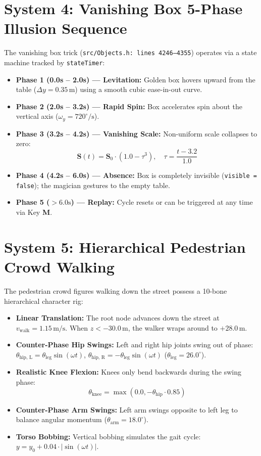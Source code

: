 \section{System 4: Vanishing Box 5-Phase Illusion Sequence}
The vanishing box trick (\texttt{src/Objects.h: lines 4246--4355}) operates via a state machine tracked by \texttt{stateTimer}:
\begin{itemize}
    \item \textbf{Phase 1 (0.0s -- 2.0s) --- Levitation:} Golden box hovers upward from the table ($\Delta y = 0.35\,\text{m}$) using a smooth cubic ease-in-out curve.
    \item \textbf{Phase 2 (2.0s -- 3.2s) --- Rapid Spin:} Box accelerates spin about the vertical axis ($\omega_y = 720^\circ/\text{s}$).
    \item \textbf{Phase 3 (3.2s -- 4.2s) --- Vanishing Scale:} Non-uniform scale collapses to zero:
    \begin{equation}
    \mathbf{S}(t) = \mathbf{S}_0 \cdot \left( 1.0 - \tau^3 \right), \quad \tau = \frac{t - 3.2}{1.0}
    \end{equation}
    \item \textbf{Phase 4 (4.2s -- 6.0s) --- Absence:} Box is completely invisible (\texttt{visible = false}); the magician gestures to the empty table.
    \item \textbf{Phase 5 ($> 6.0\text{s}$) --- Replay:} Cycle resets or can be triggered at any time via Key \textbf{M}.
\end{itemize}

\section{System 5: Hierarchical Pedestrian Crowd Walking}
The pedestrian crowd figures walking down the street possess a 10-bone hierarchical character rig:
\begin{itemize}
    \item \textbf{Linear Translation:} The root node advances down the street at $v_{\text{walk}} = 1.15\,\text{m/s}$. When $z < -30.0\,\text{m}$, the walker wraps around to $+28.0\,\text{m}$.
    \item \textbf{Counter-Phase Hip Swings:} Left and right hip joints swing out of phase: $\theta_{\text{hip, L}} = \theta_{\text{leg}} \sin(\omega t)$, $\theta_{\text{hip, R}} = -\theta_{\text{leg}} \sin(\omega t)$ ($\theta_{\text{leg}} = 26.0^\circ$).
    \item \textbf{Realistic Knee Flexion:} Knees only bend backwards during the swing phase:
    \begin{equation}
    \theta_{\text{knee}} = \max\left( 0.0, -\theta_{\text{hip}} \cdot 0.85 \right)
    \end{equation}
    \item \textbf{Counter-Phase Arm Swings:} Left arm swings opposite to left leg to balance angular momentum ($\theta_{\text{arm}} = 18.0^\circ$).
    \item \textbf{Torso Bobbing:} Vertical bobbing simulates the gait cycle: $y = y_0 + 0.04 \cdot |\sin(\omega t)|$.
\end{itemize}

